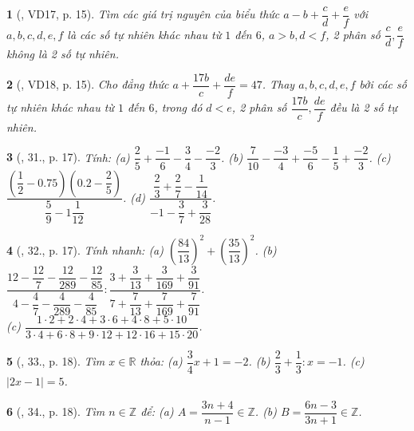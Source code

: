 \documentclass{article}
\newtheorem{baitoan}{}
\begin{document}
\begin{baitoan}[\cite{Binh_Toan_6_tap_2}, VD17, p. 15]
	Tìm các giá trị nguyên của biểu thức $a - b + \dfrac{c}{d} + \dfrac{e}{f}$ với $a,b,c,d,e,f$ là các số tự nhiên khác nhau từ $1$ đến $6$, $a > b,d < f$, 2 phân số $\dfrac{c}{d},\dfrac{e}{f}$ không là 2 số tự nhiên.
\end{baitoan}

\begin{baitoan}[\cite{Binh_Toan_6_tap_2}, VD18, p. 15]
	Cho đẳng thức $a + \dfrac{17b}{c} + \dfrac{de}{f} = 47$. Thay $a,b,c,d,e,f$ bởi các số tự nhiên khác nhau từ $1$ đến $6$, trong đó $d < e$, 2 phân số $\dfrac{17b}{c},\dfrac{de}{f}$ đều là 2 số tự nhiên.
\end{baitoan}

\begin{baitoan}[\cite{Binh_Toan_6_tap_2}, 31., p. 17]
	Tính: (a) $\dfrac{2}{5} + \dfrac{-1}{6} - \dfrac{3}{4} - \dfrac{-2}{3}$. (b) $\dfrac{7}{10} - \dfrac{-3}{4} + \dfrac{-5}{6} - \dfrac{1}{5} + \dfrac{-2}{3}$. (c) $\dfrac{\left(\dfrac{1}{2} - 0.75\right)\left(0.2 - \dfrac{2}{5}\right)}{\dfrac{5}{9} - 1\dfrac{1}{12}}$. (d) $\dfrac{\dfrac{2}{3} + \dfrac{2}{7} - \dfrac{1}{14}}{-1 - \dfrac{3}{7} + \dfrac{3}{28}}$.
\end{baitoan}

\begin{baitoan}[\cite{Binh_Toan_6_tap_2}, 32., p. 17]
	Tính nhanh: (a) $\left(\dfrac{84}{13}\right)^2 + \left(\dfrac{35}{13}\right)^2$. (b) $\dfrac{12 - \dfrac{12}{7} - \dfrac{12}{289} - \dfrac{12}{85}}{4 - \dfrac{4}{7} - \dfrac{4}{289} - \dfrac{4}{85}}:\dfrac{3 + \dfrac{3}{13} + \dfrac{3}{169} + \dfrac{3}{91}}{7 + \dfrac{7}{13} + \dfrac{7}{169} + \dfrac{7}{91}}$.\\(c) $\dfrac{1\cdot2 + 2\cdot4 + 3\cdot6 + 4\cdot8 + 5\cdot10}{3\cdot4 + 6\cdot8 + 9\cdot12 + 12\cdot16 + 15\cdot20}$.
\end{baitoan}

\begin{baitoan}[\cite{Binh_Toan_6_tap_2}, 33., p. 18]
	Tìm $x\in\mathbb{R}$ thỏa: (a) $\dfrac{3}{4}x + 1 = -2$. (b) $\dfrac{2}{3} + \dfrac{1}{3}:x = -1$. (c) $|2x - 1| = 5$.
\end{baitoan}

\begin{baitoan}[\cite{Binh_Toan_6_tap_2}, 34., p. 18]
	Tìm $n\in\mathbb{Z}$ để: (a) $A = \dfrac{3n + 4}{n - 1}\in\mathbb{Z}$. (b) $B = \dfrac{6n - 3}{3n + 1}\in\mathbb{Z}$.
\end{baitoan}
\end{document}
